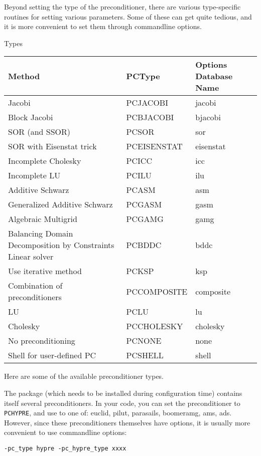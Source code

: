 Beyond setting the type of the preconditioner, there are various
type-specific routines for setting various parameters. Some of these
can get quite tedious, and it is more convenient to set them through
commandline options.

 {Types}
\label{sec:petsc-prec-list}

\begin{tabular}{p{2in}ll}
\toprule
Method&PCType&Options Database Name\\
\midrule
Jacobi&PCJACOBI&jacobi\\
Block Jacobi&PCBJACOBI&bjacobi\\
SOR (and SSOR)&PCSOR&sor\\
SOR with Eisenstat trick&PCEISENSTAT&eisenstat\\
Incomplete Cholesky&PCICC&icc\\
Incomplete LU&PCILU&ilu\\
Additive Schwarz&PCASM&asm\\
Generalized Additive Schwarz&PCGASM&gasm\\
Algebraic Multigrid&PCGAMG&gamg\\
Balancing Domain Decomposition by Constraints Linear solver&PCBDDC&bddc\\
Use iterative method&PCKSP&ksp\\
Combination of preconditioners&PCCOMPOSITE&composite\\
LU&PCLU&lu\\
Cholesky&PCCHOLESKY&cholesky\\
No preconditioning&PCNONE&none\\
Shell for user-defined PC&PCSHELL&shell  \\
\bottomrule
\end{tabular}

Here are some of the available preconditioner types.

The  package
(which needs to be installed during configuration time)
contains itself several preconditioners.
In your code, you can set the preconditioner to \lstinline{PCHYPRE},
and use  to one of:
euclid, pilut, parasails, boomeramg, ams, ads.
However, since these preconditioners themselves have options,
it is usually more convenient to use commandline options:
\begin{verbatim}
-pc_type hypre -pc_hypre_type xxxx
\end{verbatim}

\begin{comment}
  hypre with drop tolerance:

  You can run with -help to see this: 

 -pc_hypre_euclid_level <now -2 : formerly -2>: Factorization levels (None)
  -pc_hypre_euclid_droptolerance <0. : 0.>: Drop tolerance for ILU(k) in Euclid (None)
  -pc_hypre_euclid_bj: <FALSE : FALSE> Use Block Jacobi for ILU in Euclid (None)
\end{comment}

